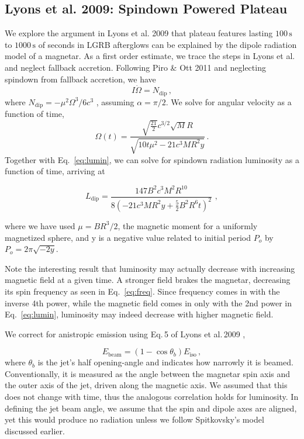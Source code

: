 \documentclass{article}
\begin{document}
\subsection{Lyons et al. 2009: Spindown Powered Plateau}
We explore the argument in Lyons et al. 2009 \cite{Lyons:2009ka} that plateau features lasting $100\,\mathrm{s}$ to $1000\,\mathrm{s}$ of seconds in LGRB afterglows can be explained by the dipole radiation model of a magnetar.
As a first order estimate, we trace the steps in Lyons et al. and neglect fallback accretion. Following Piro \& Ott 2011 \cite{Piro:2011ed} and neglecting spindown from fallback accretion, we have
\begin{equation} I \dot{\Omega}=N_{\mathrm{dip}}\,, \end{equation}
where $N_{\mathrm{dip}}= -\mu ^2 \Omega^3/6c^3$\,\,,
assuming $\alpha = \pi/2$.
We solve for angular velocity as a function of time,
\begin{equation}\label{eq:freq}
\Omega(t) = \frac{\sqrt{\frac{21}{2}} c^{3/2} \sqrt{M} R}{\sqrt{10 t\mu^2 - 21 c^3 M R^2 y}}\,.
\end{equation}
Together with Eq.~\ref{eq:lumin}, we can solve for spindown radiation luminosity as a function of time, arriving at

\begin{equation}
L_\mathrm{dip}=\frac{147 B^2 c^3 M^2 R^{10}}{8(-21 c^3 M R^2 y+ \frac{5}{2} B^2 R^6 t)^2}\,\,,
\end{equation}

where we have used $\mu= B R^3/2$, the magnetic moment for a uniformly magnetized sphere, and y is a negative value related to initial period $P_o$ by $P_o= 2\pi \sqrt{-2 y}$.

\hspace{4cm}

Note the interesting result that luminosity may actually decrease with increasing magnetic field at a given time. A stronger field brakes the magnetar, decreasing its spin frequency as seen in Eq.~\ref{eq:freq}. Since frequency comes in with the inverse 4th power, while the magnetic field comes in only with the 2nd power in Eq.~\ref{eq:lumin}, luminosity may indeed decrease with higher magnetic field.

We correct for anistropic emission using Eq.\,5 of Lyons et al.\,2009 \cite{Lyons:2009ka},

\begin{equation}
 E_{\mathrm{beam}}= (1-\cos{\theta_b}) E_{\mathrm{iso}}\,,
 \end{equation}
 where $\theta_b$ is the jet's half opening-angle and indicates how narrowly it is beamed. Conventionally, it is measured as the angle between the magnetar spin axis and the outer axis of the jet, driven along the magnetic axis. We assumed that this does not change with time, thus the analogous correlation holds for luminosity. In defining the jet beam angle, we assume that the spin and dipole axes are aligned, yet this would produce no radiation unless we follow Spitkovsky's model discussed earlier. 
\end{document}
